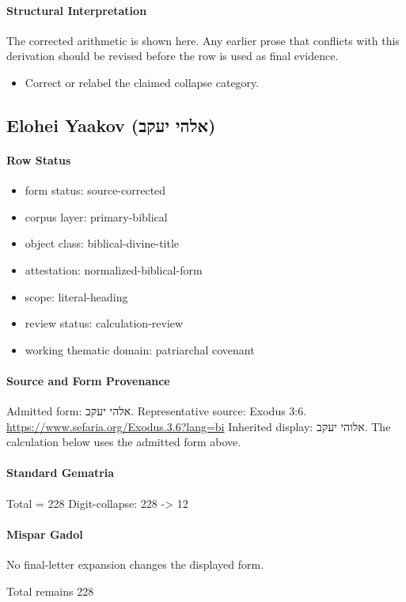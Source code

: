 \paragraph{Structural Interpretation}
The corrected arithmetic is shown here. Any earlier prose that conflicts with this derivation should be revised before the row is used as final evidence.

\begin{itemize}
\item Correct or relabel the claimed collapse category.
\end{itemize}

\subsection{Elohei Yaakov (אלהי יעקב)}
\paragraph{Row Status}
\begin{itemize}
\item form status: source-corrected
\item corpus layer: primary-biblical
\item object class: biblical-divine-title
\item attestation: normalized-biblical-form
\item scope: literal-heading
\item review status: calculation-review
\item working thematic domain: patriarchal covenant
\end{itemize}
\paragraph{Source and Form Provenance}
Admitted form: אלהי יעקב.
Representative source: Exodus 3:6.
\url{https://www.sefaria.org/Exodus.3.6?lang=bi}
Inherited display: אלוהי יעקב. The calculation below uses the admitted form above.
\paragraph{Standard Gematria}
Total = 228
Digit-collapse: 228 -> 12
\paragraph{Mispar Gadol}
No final-letter expansion changes the displayed form.

Total remains 228

